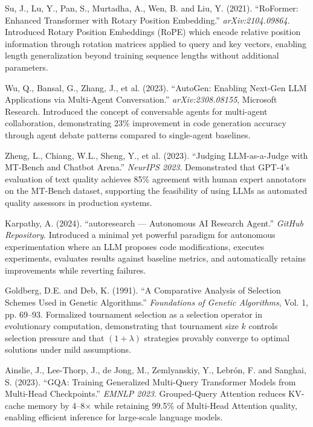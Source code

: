 \begin{enumerate}[label={[\arabic*]}, leftmargin=2cm]
\item Su, J., Lu, Y., Pan, S., Murtadha, A., Wen, B. and Liu, Y. (2021). ``RoFormer: Enhanced Transformer with Rotary Position Embedding.'' \textit{arXiv:2104.09864}. Introduced Rotary Position Embeddings (RoPE) which encode relative position information through rotation matrices applied to query and key vectors, enabling length generalization beyond training sequence lengths without additional parameters.

\item Wu, Q., Bansal, G., Zhang, J., et al. (2023). ``AutoGen: Enabling Next-Gen LLM Applications via Multi-Agent Conversation.'' \textit{arXiv:2308.08155}, Microsoft Research. Introduced the concept of conversable agents for multi-agent collaboration, demonstrating 23\% improvement in code generation accuracy through agent debate patterns compared to single-agent baselines.

\item Zheng, L., Chiang, W.L., Sheng, Y., et al. (2023). ``Judging LLM-as-a-Judge with MT-Bench and Chatbot Arena.'' \textit{NeurIPS 2023}. Demonstrated that GPT-4's evaluation of text quality achieves 85\% agreement with human expert annotators on the MT-Bench dataset, supporting the feasibility of using LLMs as automated quality assessors in production systems.

\item Karpathy, A. (2024). ``autoresearch --- Autonomous AI Research Agent.'' \textit{GitHub Repository}. Introduced a minimal yet powerful paradigm for autonomous experimentation where an LLM proposes code modifications, executes experiments, evaluates results against baseline metrics, and automatically retains improvements while reverting failures.

\item Goldberg, D.E. and Deb, K. (1991). ``A Comparative Analysis of Selection Schemes Used in Genetic Algorithms.'' \textit{Foundations of Genetic Algorithms}, Vol. 1, pp. 69--93. Formalized tournament selection as a selection operator in evolutionary computation, demonstrating that tournament size $k$ controls selection pressure and that $(1+\lambda)$ strategies provably converge to optimal solutions under mild assumptions.

\item Ainslie, J., Lee-Thorp, J., de Jong, M., Zemlyanskiy, Y., Lebr\'{o}n, F. and Sanghai, S. (2023). ``GQA: Training Generalized Multi-Query Transformer Models from Multi-Head Checkpoints.'' \textit{EMNLP 2023}. Grouped-Query Attention reduces KV-cache memory by 4--8$\times$ while retaining 99.5\% of Multi-Head Attention quality, enabling efficient inference for large-scale language models.


\end{enumerate}
